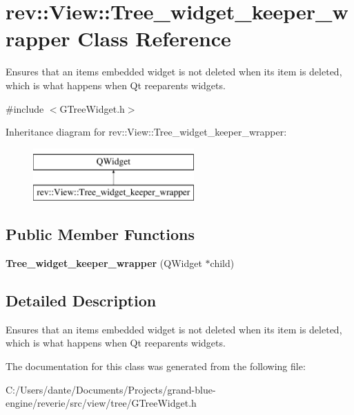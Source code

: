 \hypertarget{classrev_1_1_view_1_1_tree__widget__keeper__wrapper}{}\section{rev\+::View\+::Tree\+\_\+widget\+\_\+keeper\+\_\+wrapper Class Reference}
\label{classrev_1_1_view_1_1_tree__widget__keeper__wrapper}


Ensures that an item\textquotesingle{}s embedded widget is not deleted when its item is deleted, which is what happens when Qt reeparents widgets.  




{\ttfamily \#include $<$G\+Tree\+Widget.\+h$>$}

Inheritance diagram for rev\+::View\+::Tree\+\_\+widget\+\_\+keeper\+\_\+wrapper\+:\begin{figure}[H]
\begin{center}
\leavevmode
\includegraphics[height=2.000000cm]{classrev_1_1_view_1_1_tree__widget__keeper__wrapper}
\end{center}
\end{figure}
\subsection*{Public Member Functions}
\begin{DoxyCompactItemize}
\item 
\mbox{\label{classrev_1_1_view_1_1_tree__widget__keeper__wrapper_afe7c0af756f7d6d37b1708fef74b53b0}} 
{\bfseries Tree\+\_\+widget\+\_\+keeper\+\_\+wrapper} (Q\+Widget $\ast$child)
\end{DoxyCompactItemize}


\subsection{Detailed Description}
Ensures that an item\textquotesingle{}s embedded widget is not deleted when its item is deleted, which is what happens when Qt reeparents widgets. 

The documentation for this class was generated from the following file\+:\begin{DoxyCompactItemize}
\item 
C\+:/\+Users/dante/\+Documents/\+Projects/grand-\/blue-\/engine/reverie/src/view/tree/G\+Tree\+Widget.\+h\end{DoxyCompactItemize}
